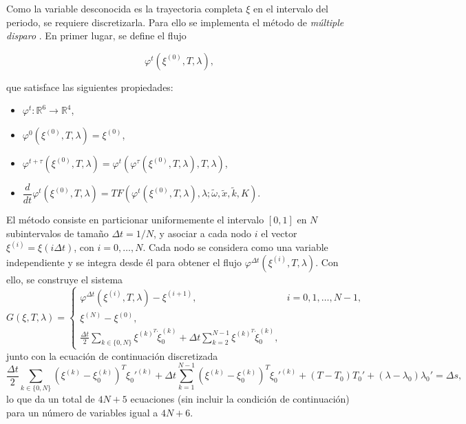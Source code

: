 Como la variable desconocida es la trayectoria completa $ \xi $ en el intervalo del periodo, se requiere discretizarla.
Para ello se implementa el método de \emph{múltiple disparo} \cite{FARANTOS1998240}. En primer lugar, se define el flujo

\[
    \varphi^{t}(\xi^{(0)}, T, \lambda),
\]

que satisface las siguientes propiedades:

\begin{itemize}
    \item $ \varphi^t:\mathbb{R}^{6} \to \mathbb{R}^{4} $,
    \item $ \varphi^0(\xi^{(0)}, T, \lambda) = \xi^{(0)} $,
    \item $ \varphi^{t+\tau}(\xi^{(0)}, T, \lambda) = \varphi^t(\varphi^{\tau}(\xi^{(0)}, T, \lambda), T, \lambda) $,
    \item $ \dfrac{d}{dt}\varphi^{t}(\xi^{(0)}, T, \lambda) = T F(\varphi^t(\xi^{(0)}, T, \lambda), \lambda; \tilde{\omega}, \tilde{x}, \tilde{k}, K) $.
\end{itemize}

El método consiste en particionar uniformemente el intervalo $[0,1]$ en $N$ subintervalos de tamaño
$\Delta t = 1/N$, y asociar a cada nodo $i$ el vector $\xi^{(i)} = \xi(i \Delta t)$, con $i = 0, \dots, N$.
Cada nodo se considera como una variable independiente y se integra desde él para obtener el flujo
$\varphi^{\Delta t}(\xi^{(i)}, T, \lambda)$. Con ello, se construye el sistema
\begin{equation}
    G(\xi, T, \lambda) =
    \begin{cases}
        \varphi^{\Delta t}(\xi^{(i)}, T, \lambda) - \xi^{(i+1)}, & i = 0, 1, \dots, N-1, \\[1mm]
        \xi^{(N)} - \xi^{(0)},                                                           \\[1mm]
        \frac{\Delta t}{2} \sum_{k \in \{0, N\}} \xi^{(k)^T} \dot{\xi}_{0}^{(k)}
        + \Delta t \sum_{k=2}^{N-1} \xi^{(k)^T} \dot{\xi}_{0}^{(k)} ,
    \end{cases}
    \label{eq:multiple_shooting}
\end{equation}
junto con la ecuación de continuación discretizada
\begin{equation}
    \frac{\Delta t}{2} \sum_{k \in \{0, N\}}
    (\xi^{(k)} - \xi_0^{(k)})^{T} \xi_0'^{(k)} +
    \Delta t \sum_{k=1}^{N-1}
    (\xi^{(k)} - \xi_0^{(k)})^{T} \xi_0'^{(k)}
    + (T - T_0) T_0'
    + (\lambda - \lambda_0) \lambda_0'
    = \Delta s ,
    \label{eq:arclenght_ms}
\end{equation}
lo que da un total de $4N + 5$ ecuaciones (sin incluir la condición de continuación) para un número de variables igual a $4N + 6$.


